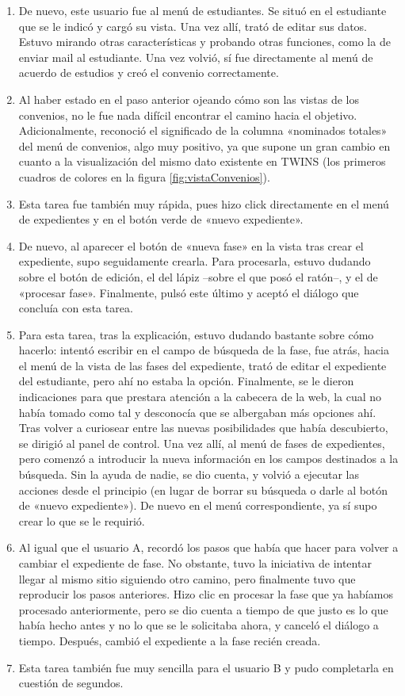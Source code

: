 \begin{enumerate}
	\item De nuevo, este usuario fue al menú de estudiantes. Se situó en el estudiante que se le indicó y cargó su vista. Una vez allí, trató de editar sus datos. Estuvo mirando otras características y probando otras funciones, como la de enviar mail al estudiante. Una vez volvió, sí fue directamente al menú de acuerdo de estudios y creó el convenio correctamente.
	\item Al haber estado en el paso anterior ojeando cómo son las vistas de los convenios, no le fue nada difícil encontrar el camino hacia el objetivo. Adicionalmente, reconoció el significado de la columna «nominados totales» del menú de convenios, algo muy positivo, ya que supone un gran cambio en cuanto a la visualización del mismo dato existente en TWINS (los primeros cuadros de colores en la figura \ref{fig:vistaConvenios}).
	\item Esta tarea fue también muy rápida, pues hizo click directamente en el menú de expedientes y en el botón verde de «nuevo expediente».
	\item De nuevo, al aparecer el botón de «nueva fase» en la vista tras crear el expediente, supo seguidamente crearla. Para procesarla, estuvo dudando sobre el botón de edición, el del lápiz --sobre el que posó el ratón--,  y el de «procesar fase». Finalmente, pulsó este último y aceptó el diálogo que concluía con esta tarea.
	\item Para esta tarea, tras la explicación, estuvo dudando bastante sobre cómo hacerlo: intentó escribir en el campo de búsqueda de la fase, fue atrás, hacia el menú de la vista de las fases del expediente, trató de editar el expediente del estudiante, pero ahí no estaba la opción. Finalmente, se le dieron indicaciones para que prestara atención a la cabecera de la web, la cual no había tomado como tal y desconocía que se albergaban más opciones ahí. Tras volver a curiosear entre las nuevas posibilidades que había descubierto, se dirigió al panel de control. Una vez allí, al menú de fases de expedientes, pero comenzó a introducir la nueva información en los campos destinados a la búsqueda. Sin la ayuda de nadie, se dio cuenta, y volvió a ejecutar las acciones desde el principio (en lugar de borrar su búsqueda o darle al botón de «nuevo expediente»). De nuevo en el menú correspondiente, ya sí supo crear lo que se le requirió.
	\item Al igual que el usuario A, recordó los pasos que había que hacer para volver a cambiar el expediente de fase. No obstante, tuvo la iniciativa de intentar llegar al mismo sitio siguiendo otro camino, pero finalmente tuvo que reproducir los pasos anteriores. Hizo clic en procesar la fase que ya habíamos procesado anteriormente, pero se dio cuenta a tiempo de que justo es lo que había hecho antes y no lo que se le solicitaba ahora, y canceló el diálogo a tiempo. Después, cambió el expediente a la fase recién creada.
	\item Esta tarea también fue muy sencilla para el usuario B y pudo completarla en cuestión de segundos.
	
\end{enumerate}

